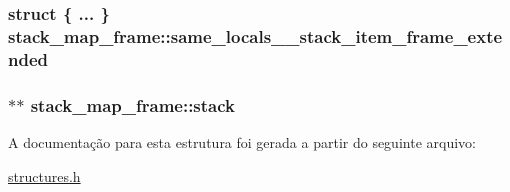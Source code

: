 \subsubsection[{\texorpdfstring{same\+\_\+locals\+\_\+1\+\_\+stack\+\_\+item\+\_\+frame\+\_\+extended}{same_locals_1_stack_item_frame_extended}}]{\setlength{\rightskip}{0pt plus 5cm}struct \{ ... \}   stack\+\_\+map\+\_\+frame\+::same\+\_\+locals\+\_\+\_\+stack\+\_\+item\+\_\+frame\+\_\+extended}\hypertarget{structstack__map__frame_a13c670726708696c2f2b9d12309d7038}{}\label{structstack__map__frame_a13c670726708696c2f2b9d12309d7038}
\subsubsection[{\texorpdfstring{stack}{stack}}]{$\ast$$\ast$ stack\+\_\+map\+\_\+frame\+::stack}\hypertarget{structstack__map__frame_acf0d1f6336e72271bc0d91186a9360d5}{}\label{structstack__map__frame_acf0d1f6336e72271bc0d91186a9360d5}


A documentação para esta estrutura foi gerada a partir do seguinte arquivo\+:\begin{DoxyCompactItemize}
\item 
\hyperlink{structures_8h}{structures.\+h}\end{DoxyCompactItemize}

